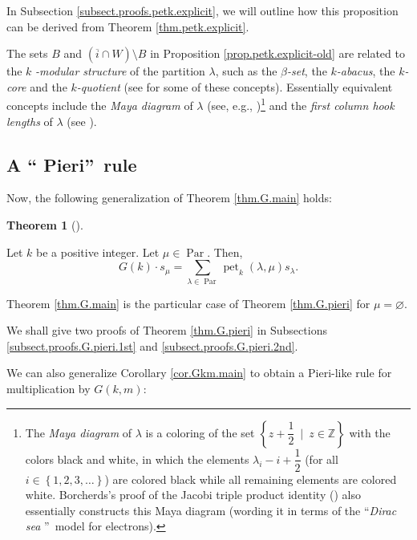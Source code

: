 \documentclass[numbers=enddot,12pt,final,onecolumn,notitlepage]{scrartcl}%
\theoremstyle{definition}
\newtheorem{theo}{Theorem}[section]
\newenvironment{theorem}[1][]
{\begin{theo}[#1]\begin{leftbar}}
{\end{leftbar}\end{theo}}
\let\sumnonlimits\sum
\renewcommand{\sum}{\sumnonlimits\limits}
\begin{document}
In Subsection \ref{subsect.proofs.petk.explicit}, we will outline how this
proposition can be derived from Theorem \ref{thm.petk.explicit}.

The sets $B$ and $\left(  \overline{i}\cap W\right)  \setminus B$ in
Proposition \ref{prop.petk.explicit-old} are related to the $k$%
\textit{-modular structure} of the partition $\lambda$, such as the $\beta
$\textit{-set}, the $k$\textit{-abacus}, the $k$\textit{-core} and the
$k$\textit{-quotient} (see \cite[\S \S 1--3]{Olsson93} for some of these
concepts). Essentially equivalent concepts include the \textit{Maya diagram}
of $\lambda$ (see, e.g., \cite[\S 3.3]{Crane18})\footnote{The \emph{Maya
diagram} of $\lambda$ is a coloring of the set $\left\{  z+\dfrac{1}{2}%
\ \mid\ z\in\mathbb{Z}\right\}  $ with the colors black and white, in which
the elements $\lambda_{i}-i+\dfrac{1}{2}$ (for all $i\in\left\{
1,2,3,\ldots\right\}  $) are colored black while all remaining elements are
colored white. Borcherds's proof of the Jacobi triple product identity
(\cite[\S 13.3]{Camero94}) also essentially constructs this Maya diagram
(wording it in terms of the \textquotedblleft\textit{Dirac sea}%
\textquotedblright\ model for electrons).} and the \textit{first column hook
lengths} of $\lambda$ (see \cite[Proposition (1.3)]{Olsson93}).

\subsection{\label{subsect.thms.pieri}A \textquotedblleft
Pieri\textquotedblright\ rule}

Now, the following generalization of Theorem \ref{thm.G.main} holds:


\begin{theorem}
\label{thm.G.pieri}Let $k$ be a positive integer. Let $\mu\in
\operatorname*{Par}$. Then,%
\[
G\left(  k\right)  \cdot s_{\mu}=\sum_{\lambda\in\operatorname*{Par}%
}\operatorname*{pet}\nolimits_{k}\left(  \lambda,\mu\right)  s_{\lambda}.
\]

\end{theorem}


Theorem \ref{thm.G.main} is the particular case of Theorem \ref{thm.G.pieri}
for $\mu=\varnothing$.

We shall give two proofs of Theorem \ref{thm.G.pieri} in Subsections
\ref{subsect.proofs.G.pieri.1st} and \ref{subsect.proofs.G.pieri.2nd}.

We can also generalize Corollary \ref{cor.Gkm.main} to obtain a Pieri-like
rule for multiplication by $G\left(  k,m\right)  $:
\end{document}
